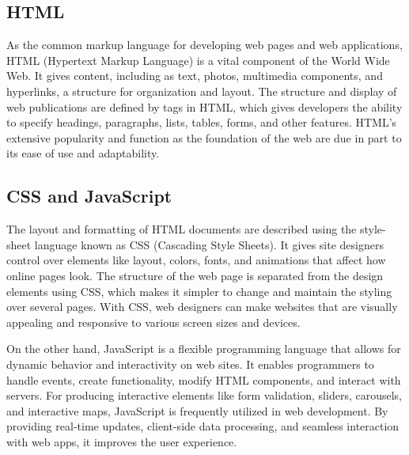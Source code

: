 \subsection{HTML}

\par As the common markup language for developing web pages and web applications, HTML (Hypertext Markup Language) is a vital component of the World Wide Web. It gives content, including as text, photos, multimedia components, and hyperlinks, a structure for organization and layout. The structure and display of web publications are defined by tags in HTML, which gives developers the ability to specify headings, paragraphs, lists, tables, forms, and other features. HTML's extensive popularity and function as the foundation of the web are due in part to its ease of use and adaptability. \cite{mozillaHTML}

\subsection{CSS and JavaScript}

\par The layout and formatting of HTML documents are described using the style-sheet language known as CSS (Cascading Style Sheets). It gives site designers control over elements like layout, colors, fonts, and animations that affect how online pages look. The structure of the web page is separated from the design elements using CSS, which makes it simpler to change and maintain the styling over several pages. With CSS, web designers can make websites that are visually appealing and responsive to various screen sizes and devices. \cite{mozillaCSS}

\par On the other hand, JavaScript is a flexible programming language that allows for dynamic behavior and interactivity on web sites. It enables programmers to handle events, create functionality, modify HTML components, and interact with servers. For producing interactive elements like form validation, sliders, carousels, and interactive maps, JavaScript is frequently utilized in web development. By providing real-time updates, client-side data processing, and seamless interaction with web apps, it improves the user experience. \cite{mozillaJS}

